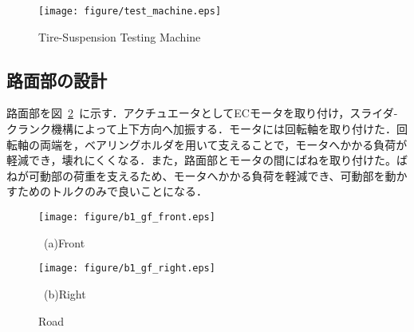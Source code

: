 \documentclass[a4paper,12pt]{article_vdlab_sotsuron}
\begin{document}
\vspace*{10mm}
\begin{figure}[htp]
  \begin{center}
    \texttt{[image: figure/test\_machine.eps]}
    \vspace*{3mm}
    \caption{Tire-Suspension Testing Machine}
    \label{fig:test_machine}
  \end{center}
\end{figure}

\newpage
\subsection{路面部の設計}
路面部を図~\ref{fig:b1_gf}~に示す．アクチュエータとしてECモータを取り付け，スライダ-クランク機構によって上下方向へ加振する．モータには回転軸を取り付けた．回転軸の両端を，ベアリングホルダを用いて支えることで，モータへかかる負荷が軽減でき，壊れにくくなる．また，路面部とモータの間にばねを取り付けた。ばねが可動部の荷重を支えるため、モータへかかる負荷を軽減でき、可動部を動かすためのトルクのみで良いことになる．

\vspace*{10mm}
\begin{figure}[h!]
  \begin{minipage}{0.5\hsize}
  \begin{center} 
    \texttt{[image: figure/b1\_gf\_front.eps]}
    \end{center}
    \begin{center}
    \vspace{3mm}
    \ (a)Front\
    \end{center}
  \end{minipage}
  \begin{minipage}{0.5\hsize}
     \begin{center}
      \texttt{[image: figure/b1\_gf\_right.eps]}
      \end{center}
      \begin{center}
      \vspace{3mm}
      \ (b)Right\
    \end{center}
  \end{minipage}
  \vspace*{3mm}
  \caption{Road}
    \label{fig:b1_gf}
 \end{figure}

\newpage
\end{document}
